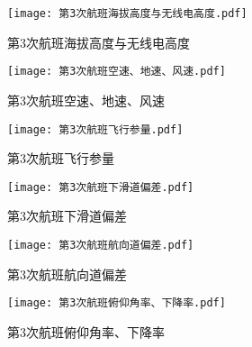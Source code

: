 \documentclass{MathorCupModeling}
\begin{document}
	\begin{figure}[H]
		\centering
		\begin{minipage}{0.48\linewidth}
			\centering
			\texttt{[image: 第3次航班海拔高度与无线电高度.pdf]}
			\caption{第3次航班海拔高度与无线电高度}
			\label{fig:第3次航班海拔高度与无线电高度}
		\end{minipage}
		\begin{minipage}{0.48\linewidth}
			\centering
			\texttt{[image: 第3次航班空速、地速、风速.pdf]}
			\caption{第3次航班空速、地速、风速}
			\label{fig:第3次航班空速、地速、风速}
		\end{minipage}
	\end{figure}
	\begin{figure}[H]
		\centering
		\begin{minipage}{0.48\linewidth}
			\centering
			\texttt{[image: 第3次航班飞行参量.pdf]}
			\caption{第3次航班飞行参量}
			\label{fig:第3次航班飞行参量}
		\end{minipage}
		\begin{minipage}{0.48\linewidth}
			\centering
			\texttt{[image: 第3次航班下滑道偏差.pdf]}
			\caption{第3次航班下滑道偏差}
			\label{fig:第3次航班下滑道偏差}
		\end{minipage}
	\end{figure}
	\begin{figure}[H]
		\centering
		\begin{minipage}{0.48\linewidth}
			\centering
			\texttt{[image: 第3次航班航向道偏差.pdf]}
			\caption{第3次航班航向道偏差}
			\label{fig:第3次航班航向道偏差}
		\end{minipage}
		\begin{minipage}{0.48\linewidth}
			\centering
			\texttt{[image: 第3次航班俯仰角率、下降率.pdf]}
			\caption{第3次航班俯仰角率、下降率}
			\label{fig:第3次航班俯仰角率、下降率}
		\end{minipage}
	\end{figure}
\end{document}
